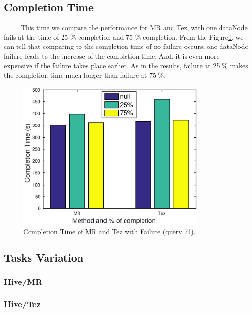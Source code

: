 \documentclass[10pt]{article}
\begin{document}
\subsection{Completion Time}

~~~~~This time we compare the performance for MR and Tez, with one dataNode fails at the time of 25 \% completion and 75 \% completion. From the Figure\ref{fig:q3a_time}, we can tell that comparing to the completion time of no failure occurs, one dataNode failure leads to the increase of the completion time. And, it is even more expensive if the failure takes place earlier. As in the results, failure at 25 \% makes the completion time much longer than failure at 75 \%.


\begin{figure}
\begin{center}
\includegraphics[width=0.85\textwidth]{pic/q3a_time}
\caption{Completion Time of MR and Tez with Failure (query 71).}
\label{fig:q3a_time}
\end{center}
\end{figure}

\subsection{Tasks Variation}

\subsubsection{Hive/MR}
\subsubsection{Hive/Tez}
\end{document}
